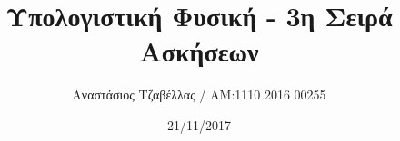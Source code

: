 \documentclass[11pt]{article}
\begin{document}
\title{Υπολογιστική Φυσική - 3η Σειρά Ασκήσεων}
\author{Αναστάσιος Τζαβέλλας / ΑΜ:1110 2016 00255}
\date{21/11/2017}
\maketitle


\FloatBarrier

\FloatBarrier

\FloatBarrier

\FloatBarrier

\FloatBarrier

\end{document}
